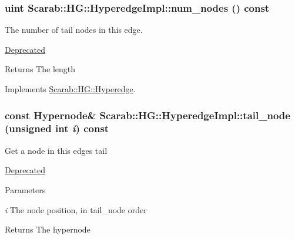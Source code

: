 \hypertarget{classScarab_1_1HG_1_1HyperedgeImpl_a9a5bef8789c9c7caee6f53833ea4acc7}{
\subsubsection[{num\_\-nodes}]{\setlength{\rightskip}{0pt plus 5cm}uint Scarab::HG::HyperedgeImpl::num\_\-nodes () const}}
\label{classScarab_1_1HG_1_1HyperedgeImpl_a9a5bef8789c9c7caee6f53833ea4acc7}
The number of tail nodes in this edge. \begin{Desc}
\item[\hyperlink{deprecated__deprecated000004}{Deprecated}]\end{Desc}
\begin{DoxyReturn}{Returns}
The length 
\end{DoxyReturn}


Implements \hyperlink{classScarab_1_1HG_1_1Hyperedge_a799d8d98242c129d7eee178bdf1fb535}{Scarab::HG::Hyperedge}.

\hypertarget{classScarab_1_1HG_1_1HyperedgeImpl_a7087ba121f3056eb5946d1909c4b3d58}{
\subsubsection[{tail\_\-node}]{\setlength{\rightskip}{0pt plus 5cm}const {\bf Hypernode}\& Scarab::HG::HyperedgeImpl::tail\_\-node (unsigned int {\em i}) const}}
\label{classScarab_1_1HG_1_1HyperedgeImpl_a7087ba121f3056eb5946d1909c4b3d58}
Get a node in this edges tail \begin{Desc}
\item[\hyperlink{deprecated__deprecated000003}{Deprecated}]\end{Desc}

\begin{DoxyParams}{Parameters}
\item[{\em i}]The node position, in tail\_\-node order\end{DoxyParams}
\begin{DoxyReturn}{Returns}
The hypernode 
\end{DoxyReturn}



